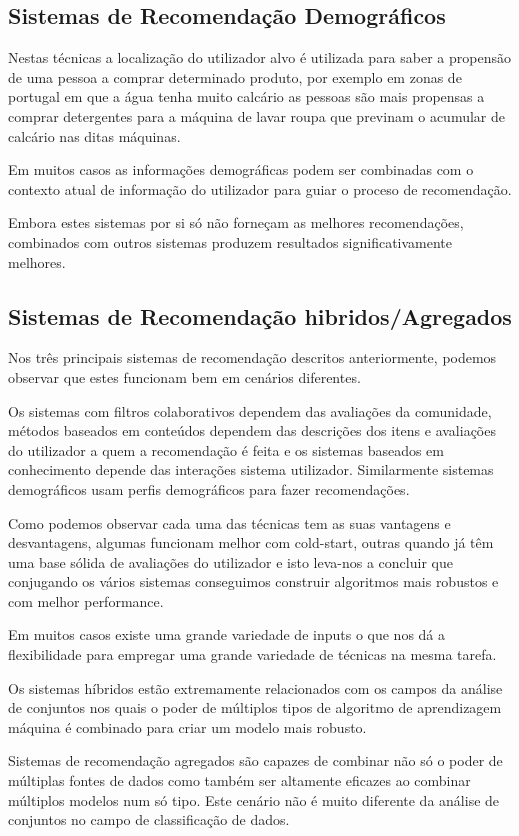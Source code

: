\hfill
\subsection{Sistemas de Recomendação Demográficos}\hfill


 \par Nestas técnicas a localização do utilizador alvo é utilizada para saber a propensão de uma pessoa a comprar determinado produto, por exemplo em zonas de portugal em que a água tenha muito calcário as pessoas são mais propensas a comprar detergentes para a máquina de lavar roupa que previnam o acumular de calcário nas ditas máquinas.
 \par Em muitos casos as informações demográficas podem ser combinadas com o contexto atual de informação do utilizador para guiar o proceso de recomendação.
 \par Embora estes sistemas por si só não forneçam as melhores recomendações, combinados com outros sistemas produzem resultados significativamente melhores.
\hfill
\subsection{Sistemas de Recomendação hibridos/Agregados}
\hfill
 \par Nos três principais sistemas de recomendação descritos anteriormente, podemos observar que estes funcionam bem em cenários diferentes. 
 \par Os sistemas com filtros colaborativos dependem das avaliações da comunidade, métodos baseados em conteúdos dependem das descrições dos itens e avaliações do utilizador a quem a recomendação é feita e os sistemas baseados em conhecimento depende das interações sistema utilizador. Similarmente sistemas demográficos usam perfis demográficos para fazer recomendações.
 \par Como podemos observar cada uma das técnicas tem as suas vantagens e desvantagens, algumas funcionam melhor com cold-start, outras quando já têm uma base sólida de avaliações do utilizador e isto leva-nos a concluir que conjugando os vários sistemas conseguimos construir algoritmos mais robustos e com melhor performance.
 \par Em muitos casos existe uma grande variedade de inputs o que nos dá a flexibilidade para empregar uma grande variedade de técnicas na mesma tarefa.
 \par Os sistemas híbridos estão extremamente relacionados com os campos da análise de conjuntos nos quais o poder de múltiplos tipos de algoritmo de aprendizagem máquina é combinado para criar um modelo mais robusto.
 \par Sistemas de recomendação agregados são capazes de combinar não só o poder de múltiplas fontes de dados como também ser altamente eficazes ao combinar múltiplos modelos num só tipo. Este cenário não é muito diferente da análise de conjuntos no campo de classificação de dados.

